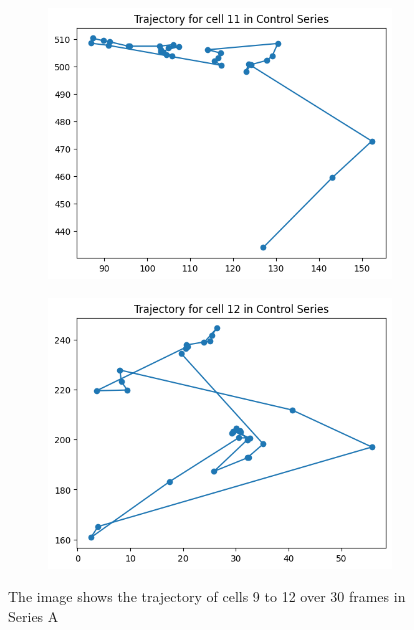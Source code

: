\documentclass{article}
\begin{document}
\begin{figure}[h!]
    \begin{subfigure}[b]{0.5\linewidth}
        \centering
        \includegraphics[width=\linewidth]{Report/Appendix_Images/Trajectory-A-Control/trajectory_11.png}
        \caption{}
    \end{subfigure}%
    \begin{subfigure}[b]{0.5\linewidth}
        \centering
        \includegraphics[width=\linewidth]{Report/Appendix_Images/Trajectory-A-Control/trajectory_12.png}
        \caption{}
    \end{subfigure}
    \caption{The image shows the trajectory of cells 9 to 12 over 30 frames in Series A}
    \label{fig:ChoiceofCells-ControlSeries}
\end{figure}
\end{document}
